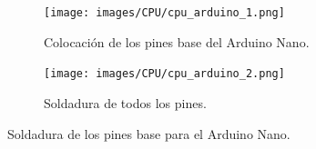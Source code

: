 \documentclass{article}
\begin{document}
\begin{figure}[H]
    \centering
    \begin{subfigure}[t]{0.3\textwidth}
        \centering
        \texttt{[image: images/CPU/cpu\_arduino\_1.png]}
        \caption{Colocación de los pines base del Arduino Nano.}
        \label{fig:cpu_arduino_1}
    \end{subfigure}%
    \begin{subfigure}[t]{0.3\textwidth}
        \centering
        \texttt{[image: images/CPU/cpu\_arduino\_2.png]}
        \caption{Soldadura de todos los pines.}
        \label{fig:cpu_arduino_2}
    \end{subfigure}
    \caption{Soldadura de los pines base para el Arduino Nano.}
    \label{fig:cpu_arduino}
\end{figure}
\end{document}
